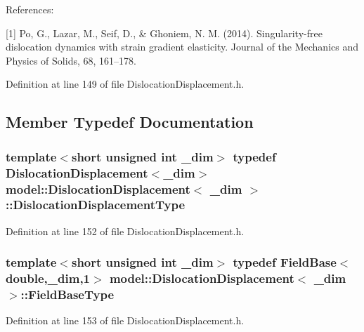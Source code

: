 References\+:

\mbox{[}1\mbox{]} Po, G., Lazar, M., Seif, D., \& Ghoniem, N. M. (2014). Singularity-\/free dislocation dynamics with strain gradient elasticity. Journal of the Mechanics and Physics of Solids, 68, 161–178. 

Definition at line 149 of file Dislocation\+Displacement.\+h.



\subsection{Member Typedef Documentation}
\hypertarget{structmodel_1_1_dislocation_displacement_adde055a38d123dbc238c2d91147116a3}{}
\subsubsection[{Dislocation\+Displacement\+Type}]{\setlength{\rightskip}{0pt plus 5cm}template$<$short unsigned int \+\_\+dim$>$ typedef {\bf Dislocation\+Displacement}$<$\+\_\+dim$>$ {\bf model\+::\+Dislocation\+Displacement}$<$ \+\_\+dim $>$\+::{\bf Dislocation\+Displacement\+Type}}\label{structmodel_1_1_dislocation_displacement_adde055a38d123dbc238c2d91147116a3}


Definition at line 152 of file Dislocation\+Displacement.\+h.

\hypertarget{structmodel_1_1_dislocation_displacement_a2c9547dc21cd314912e3e0bfd9c1306d}{}
\subsubsection[{Field\+Base\+Type}]{\setlength{\rightskip}{0pt plus 5cm}template$<$short unsigned int \+\_\+dim$>$ typedef {\bf Field\+Base}$<$double,\+\_\+dim,1$>$ {\bf model\+::\+Dislocation\+Displacement}$<$ \+\_\+dim $>$\+::{\bf Field\+Base\+Type}}\label{structmodel_1_1_dislocation_displacement_a2c9547dc21cd314912e3e0bfd9c1306d}


Definition at line 153 of file Dislocation\+Displacement.\+h.

